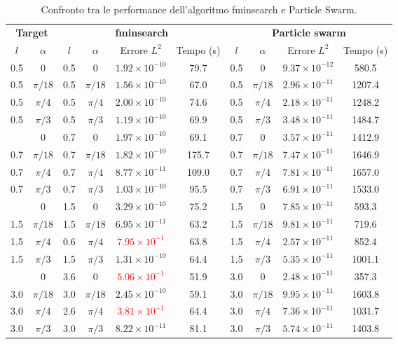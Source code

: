 \documentclass[a4paper,12pt]{article}
\theoremstyle{definition}
\begin{document}
\begin{table}[htbp]
	\centering
	\small 
	\begin{tabular}{cc | cccc | cccc}
		\toprule
		\multicolumn{2}{c}{\textbf{Target}} & \multicolumn{4}{c}{\textbf{fminsearch}} & \multicolumn{4}{c}{\textbf{Particle swarm}} \\
		\cmidrule(lr){1-2} \cmidrule(lr){3-6} \cmidrule(lr){7-10}
		$l$ & $\alpha$ & $l$ & $\alpha$ & Errore $L^2$ & Tempo (s) & $l$ & $\alpha$ & Errore $L^2$ & Tempo (s) \\
		\midrule
		0.5 & 0 & 0.5 & 0 & $1.92 \times 10^{-10}$ & 79.7  & 0.5 & 0 & $9.37 \times 10^{-12}$ & 580.5 \\
		0.5 & $\pi/18$ & 0.5 & $\pi/18$ & $1.56 \times 10^{-10}$ & 67.0  & 0.5 & $\pi/18$ & $2.96 \times 10^{-11}$ & 1207.4 \\
		0.5 & $\pi/4$ & 0.5 & $\pi/4$ & $2.00 \times 10^{-10}$ & 74.6  & 0.5 & $\pi/4$ & $2.18 \times 10^{-11}$ & 1248.2 \\
		0.5 & $\pi/3$ & 0.5 & $\pi/3$ & $1.19 \times 10^{-10}$ & 69.9  & 0.5 & $\pi/3$ & $3.48 \times 10^{-11}$ & 1484.7 \\
		\addlinespace
		0.7 & 0 & 0.7 & 0 & $1.97 \times 10^{-10}$ & 69.1  & 0.7 & 0 & $3.57 \times 10^{-11}$ & 1412.9 \\
		0.7 & $\pi/18$ & 0.7 & $\pi/18$ & $1.82 \times 10^{-10}$ & 175.7 & 0.7 & $\pi/18$ & $7.47 \times 10^{-11}$ & 1646.9 \\
		0.7 & $\pi/4$ & 0.7 & $\pi/4$ & $8.77 \times 10^{-11}$ & 109.0 & 0.7 & $\pi/4$ & $7.81 \times 10^{-11}$ & 1657.0 \\
		0.7 & $\pi/3$ & 0.7 & $\pi/3$ & $1.03 \times 10^{-10}$ & 95.5  & 0.7 & $\pi/3$ & $6.91 \times 10^{-11}$ & 1533.0 \\
		\addlinespace
		1.5 & 0 & 1.5 & 0 & $3.29 \times 10^{-10}$ & 75.2  & 1.5 & 0 & $7.85 \times 10^{-11}$ & 593.3 \\
		1.5 & $\pi/18$ & 1.5 & $\pi/18$ & $6.95 \times 10^{-11}$ & 63.2  & 1.5 & $\pi/18$ & $9.81 \times 10^{-11}$ & 719.6 \\
		1.5 & $\pi/4$ & 0.6 & $\pi/4$ & \textcolor{red}{$7.95 \times 10^{-1}$}  & 63.8  & 1.5 & $\pi/4$ & $2.57 \times 10^{-11}$ & 852.4 \\
		1.5 & $\pi/3$ & 1.5 & $\pi/3$ & $1.31 \times 10^{-10}$ & 64.4  & 1.5 & $\pi/3$ & $5.35 \times 10^{-11}$ & 1001.1 \\
		\addlinespace
		3.0 & 0 & 3.6 & 0 & \textcolor{red}{$5.06 \times 10^{-1}$}  & 51.9  & 3.0 & 0 & $2.48 \times 10^{-11}$ & 357.3 \\
		3.0 & $\pi/18$ & 3.0 & $\pi/18$ & $2.45 \times 10^{-10}$ & 59.1  & 3.0 & $\pi/18$ & $9.95 \times 10^{-11}$ & 1603.8 \\
		3.0 & $\pi/4$ & 2.6 & $\pi/4$ & \textcolor{red}{$3.81 \times 10^{-1}$}  & 64.4  & 3.0 & $\pi/4$ & $7.36 \times 10^{-11}$ & 1031.7 \\
		3.0 & $\pi/3$ & 3.0 & $\pi/3$ & $8.22 \times 10^{-11}$ & 81.1  & 3.0 & $\pi/3$ & $5.74 \times 10^{-11}$ & 1403.8 \\
		\bottomrule
	\end{tabular}
	\caption{Confronto tra le performance dell'algoritmo fminsearch e Particle Swarm.}
	\label{tab:confronto problema inverso}
\end{table}
\newpage
\printbibliography
\end{document}
